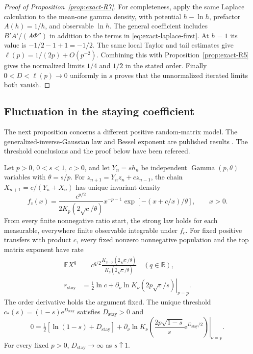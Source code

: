 \begin{proof}[Proof of Proposition~\ref{prop:exact-R7}]
For completeness, apply the same Laplace calculation to the mean-one gamma density, with potential $h-\ln h$, prefactor $A(h)=1/h$, and observable $\ln h$. The general coefficient includes $B'A'/(A\Phi'')$ in addition to the terms in \eqref{eq:exact-laplace-first}. At $h=1$ its value is $-1/2-1+1=-1/2$. The same local Taylor and tail estimates give $\ell(p)=1/(2p)+O(p^{-2})$. Combining this with Proposition~\ref{prop:exact-R5} gives the normalized limits $1/4$ and $1/2$ in the stated order. Finally $0<D<\ell(p)\to0$ uniformly in $s$ proves that the unnormalized iterated limits both vanish.
\end{proof}

\subsection{Fluctuation in the staying coefficient}

The next proposition concerns a different positive random-matrix model. The generalized-inverse-Gaussian law and Bessel exponent are published results \citep{letac1983,tourigny2007,marklof2008}. The threshold conclusions and the proof below have been refereed.

\begin{proposition}\label{prop:exact-R8}
Let $p>0$, $0<s<1$, $c>0$, and let $Y_n=sh_n$ be independent $\operatorname{Gamma}(p,\theta)$ variables with $\theta=s/p$. For $z_{n+1}=Y_nz_n+cz_{n-1}$, the chain $X_{n+1}=c/(Y_n+X_n)$ has unique invariant density
\begin{equation}
 f_c(x)=\frac{c^{p/2}}{2K_p(2\sqrt c/\theta)}
 x^{-p-1}\exp[-(x+c/x)/\theta],\qquad x>0.
 \label{eq:exact-GIG}
\end{equation}
From every finite nonnegative ratio start, the strong law holds for each measurable, everywhere finite observable integrable under $f_c$. For fixed positive transfers with product $c$, every fixed nonzero nonnegative population and the top matrix exponent have rate
\begin{equation}
 \begin{split}
 \mathbb EX^q&=c^{q/2}\frac{K_{q-p}(2\sqrt c/\theta)}{K_p(2\sqrt c/\theta)}
 \quad(q\in\mathbb R),\\
 r_{\mathrm{stay}}&=\tfrac12\ln c+
 \left.\partial_\nu\ln K_\nu(2p\sqrt c/s)\right|_{\nu=p}.
 \end{split}\label{eq:exact-Bessel}
\end{equation}
The order derivative holds the argument fixed. The unique threshold $c_*(s)=(1-s)\mathrm{e}^{D_{\mathrm{stay}}}$ satisfies $D_{\mathrm{stay}}>0$ and
\begin{equation}
 0=\tfrac12[\ln(1-s)+D_{\mathrm{stay}}]+
 \left.\partial_\nu\ln K_\nu\!\left(
 \frac{2p\sqrt{1-s}}s\mathrm{e}^{D_{\mathrm{stay}}/2}\right)\right|_{\nu=p}.
 \label{eq:exact-stay-root}
\end{equation}
For every fixed $p>0$, $D_{\mathrm{stay}}\to\infty$ as $s\uparrow1$.
\end{proposition}

